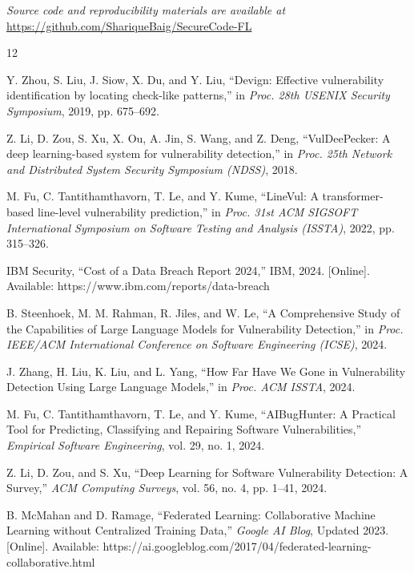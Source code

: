 \documentclass[conference]{IEEEtran}
\begin{document}
\textit{Source code and reproducibility materials are available at} \url{https://github.com/ShariqueBaig/SecureCode-FL}


\begin{thebibliography}{12}

Y. Zhou, S. Liu, J. Siow, X. Du, and Y. Liu, ``Devign: Effective vulnerability identification by locating check-like patterns,'' in \textit{Proc. 28th USENIX Security Symposium}, 2019, pp. 675--692.

Z. Li, D. Zou, S. Xu, X. Ou, A. Jin, S. Wang, and Z. Deng, ``VulDeePecker: A deep learning-based system for vulnerability detection,'' in \textit{Proc. 25th Network and Distributed System Security Symposium (NDSS)}, 2018.

M. Fu, C. Tantithamthavorn, T. Le, and Y. Kume, ``LineVul: A transformer-based line-level vulnerability prediction,'' in \textit{Proc. 31st ACM SIGSOFT International Symposium on Software Testing and Analysis (ISSTA)}, 2022, pp. 315--326.

IBM Security, ``Cost of a Data Breach Report 2024,'' IBM, 2024. [Online]. Available: https://www.ibm.com/reports/data-breach

B. Steenhoek, M. M. Rahman, R. Jiles, and W. Le, ``A Comprehensive Study of the Capabilities of Large Language Models for Vulnerability Detection,'' in \textit{Proc. IEEE/ACM International Conference on Software Engineering (ICSE)}, 2024.

J. Zhang, H. Liu, K. Liu, and L. Yang, ``How Far Have We Gone in Vulnerability Detection Using Large Language Models,'' in \textit{Proc. ACM ISSTA}, 2024.

M. Fu, C. Tantithamthavorn, T. Le, and Y. Kume, ``AIBugHunter: A Practical Tool for Predicting, Classifying and Repairing Software Vulnerabilities,'' \textit{Empirical Software Engineering}, vol. 29, no. 1, 2024.

Z. Li, D. Zou, and S. Xu, ``Deep Learning for Software Vulnerability Detection: A Survey,'' \textit{ACM Computing Surveys}, vol. 56, no. 4, pp. 1--41, 2024.

B. McMahan and D. Ramage, ``Federated Learning: Collaborative Machine Learning without Centralized Training Data,'' \textit{Google AI Blog}, Updated 2023. [Online]. Available: https://ai.googleblog.com/2017/04/federated-learning-collaborative.html


\end{thebibliography}
\end{document}
